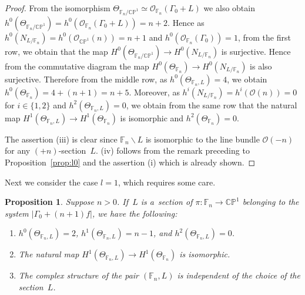 \documentclass[11pt]{article}
\numberwithin{equation}{section}
\newtheorem{Proposition}[Theorem]{Proposition}
{\theoremstyle{definition}
\newtheorem{Definition}[Theorem]{Definition}
\newtheorem{Remark}[Theorem]{Remark}
}
\begin{document}
\begin{proof}
From the isomorphism $\Theta_{\mathbb{F}_n/\mathbb{CP}^1}\simeq \mathscr O_{\mathbb{F}_n}(\Gamma_0+ L )$ we also obtain
$h^0(\Theta_{\mathbb{F}_n/\mathbb{CP}^1}) = h^0(\mathscr O_{\mathbb{F}_n}(\Gamma_0+ L )) = n + 2$.
Hence as $h^0(N_{ L /\mathbb{F}_n}) =h^0(\mathscr O_{\mathbb{CP}^1}(n)) = n+1$ and $h^0(\mathscr
O_{\mathbb{F}_n}(\Gamma_0)) = 1$, from the f\/irst row, we obtain that the map $H^0( \Theta_{\mathbb{F}_n/\mathbb{CP}^1}
) \to H^0(N_{ L /\mathbb{F}_n})$ is surjective.
Hence from the commutative diagram the map $H^0( \Theta_{\mathbb{F}_n} ) \to H^0(N_{ L /\mathbb{F}_n})$ is also
surjective.
Therefore from the middle row, as $h^0(\Theta_{\mathbb{F}_n,L}) = 4 $, we obtain $h^0(\Theta_{\mathbb{F}_n}) = 4 + (n+1)
= n+5$.
Moreover, as $h^i(N_{L/\mathbb{F}_n}) = h^i(\mathscr O(n))=0$ for $i\in\{1,2\}$ and $h^2(\Theta_{\mathbb{F}_n,L}) = 0$,
we obtain from the same row that the natural map $H^1(\Theta_{\mathbb{F}_n,L})\to H^1(\Theta_{\mathbb{F}_n})$ is
isomorphic and $h^2(\Theta_{\mathbb{F}_n})=0$.

The assertion (iii)
is clear since $\mathbb{F}_n\backslash L$ is isomorphic to the line bundle $\mathscr O(-n)$ for any
$(+n)$-section~$L$.
(iv) follows from the remark preceding to Proposition~\ref{prop:l0} and the assertion (i) which is already shown.
\end{proof}

Next we consider the case $l=1$, which requires some care.

\begin{Proposition}\label{prop:l1}
Suppose $n>0$.
If~$L$ is a~section of $\pi:\mathbb{F}_n\to\mathbb{CP}^1$ belonging to the system $|\Gamma_0 + (n+1)f|$, we have the following:
\begin{enumerate}\itemsep=0pt
\item[$(i)$] $ h^0(\Theta_{\mathbb{F}_n,L})=2$, $h^1(\Theta_{\mathbb{F}_n,L})= n-1$, and $h^2(\Theta_{\mathbb{F}_n,L})= 0$.
\item[$(ii)$] The natural map $H^1(\Theta_{\mathbb{F}_n,L})\to H^1(\Theta_{\mathbb{F}_n})$ is isomorphic.
\item[$(iii)$] The complex structure of the pair $(\mathbb{F}_n,L)$ is independent of the choice of the section~$L$.
\end{enumerate}
\end{Proposition}
\end{document}
